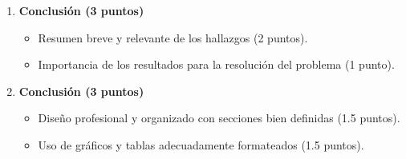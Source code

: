 \documentclass[a4,11pt]{aleph-notas}
\begin{document}
\begin{enumerate}[leftmargin=*, label=\textbf{\arabic*.}]
    \item \textbf{Conclusión (3 puntos)}
    \begin{itemize}[leftmargin=*]
        \item Resumen breve y relevante de los hallazgos (2 puntos).
        \item Importancia de los resultados para la resolución del problema (1 punto).
    \end{itemize}

    \item \textbf{Conclusión (3 puntos)}
    \begin{itemize}[leftmargin=*]
        \item Diseño profesional y organizado con secciones bien definidas (1.5 puntos).
        \item Uso de gráficos y tablas adecuadamente formateados (1.5 puntos).
    \end{itemize}
\end{enumerate}
\end{document}
